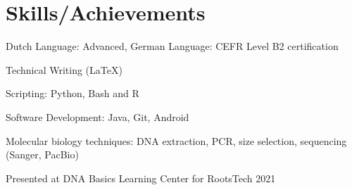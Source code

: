\documentclass{article}
\begin{document}
\section{Skills/Achievements}

\begin{blacksquareitemize}
    \item Dutch Language: Advanced, German Language: CEFR Level B2 certification
    \item Technical Writing (LaTeX)
    \item Scripting: Python, Bash and R
    \item Software Development: Java, Git, Android
    \item Molecular biology techniques: DNA extraction, PCR, size selection, sequencing (Sanger, PacBio)
    \item Presented at DNA Basics Learning Center for RootsTech 2021
\end{blacksquareitemize}
\end{document}
